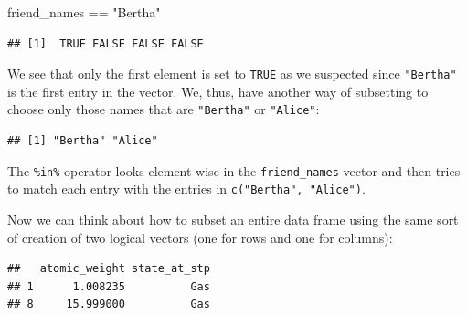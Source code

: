 \documentclass[]{tufte-book}
\newenvironment{Shaded}{\begin{snugshade}}{\end{snugshade}}
\newcommand{\KeywordTok}[1]{\textcolor[rgb]{0.13,0.29,0.53}{\textbf{{#1}}}}
\newcommand{\StringTok}[1]{\textcolor[rgb]{0.31,0.60,0.02}{{#1}}}
\newcommand{\NormalTok}[1]{{#1}}
\theoremstyle{definition}
\theoremstyle{definition}
\theoremstyle{remark}
\begin{document}
\begin{Shaded}
\begin{Highlighting}[]
\NormalTok{friend_names ==}\StringTok{ "Bertha"}
\end{Highlighting}
\end{Shaded}

\begin{verbatim}
## [1]  TRUE FALSE FALSE FALSE
\end{verbatim}

We see that only the first element is set to \texttt{TRUE} as we
suspected since \texttt{"Bertha"} is the first entry in the vector. We,
thus, have another way of subsetting to choose only those names that are
\texttt{"Bertha"} or \texttt{"Alice"}:

\begin{Shaded}
\end{Shaded}

\begin{verbatim}
## [1] "Bertha" "Alice"
\end{verbatim}

The \texttt{\%in\%} operator looks element-wise in the
\texttt{friend\_names} vector and then tries to match each entry with
the entries in \texttt{c("Bertha",\ "Alice")}.

Now we can think about how to subset an entire data frame using the same
sort of creation of two logical vectors (one for rows and one for
columns):

\begin{Shaded}
\end{Shaded}

\begin{verbatim}
##   atomic_weight state_at_stp
## 1      1.008235          Gas
## 8     15.999000          Gas
\end{verbatim}
\end{document}
